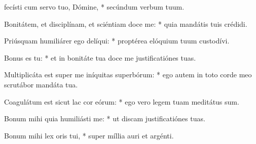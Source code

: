 \begin{psalmus}

 fecísti cum servo tuo, Dómine, * secúndum verbum tuum.

Bonitátem, et disciplínam, et sciéntiam doce me: * quia mandátis tuis crédidi.

Priúsquam humiliárer ego delíqui: * proptérea elóquium tuum custodívi.

Bonus es tu: * et in bonitáte tua doce me justificatiónes tuas.

Multiplicáta est super me iníquitas superbórum: * ego autem in toto corde meo scrutábor mandáta tua.

Coagulátum est sicut lac cor eórum: * ego vero legem tuam meditátus sum.

Bonum mihi quia humiliásti me: * ut discam justificatiónes tuas.

Bonum mihi lex oris tui, * super míllia auri et argénti.

\end{psalmus}

